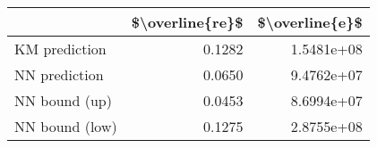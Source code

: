 \begin{tabular}{lrr}
\toprule
{} &  \$\textbackslash overline\{re\}\$ &  \$\textbackslash overline\{e\}\$ \\
\midrule
KM prediction  &           0.1282 &      1.5481e+08 \\
NN prediction  &           0.0650 &      9.4762e+07 \\
NN bound (up)  &           0.0453 &      8.6994e+07 \\
NN bound (low) &           0.1275 &      2.8755e+08 \\
\bottomrule
\end{tabular}

